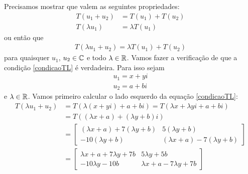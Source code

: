 \documentclass[12pt]{exam}
\begin{document}
    \solucao Precisamos mostrar que valem as seguintes propriedades:
    \begin{align}
        T(u_1 + u_2) &= T(u_1) + T(u_2)\\
        T(\lambda u_1) &= \lambda T(u_1)
    \end{align}
    ou então que
    \begin{align}\label{condicaoTL}
        T(\lambda u_1 + u_2) = \lambda T(u_1) + T(u_2)
    \end{align}
    para quaisquer $u_1$, $u_2 \in \mathbb{C}$ e todo $\lambda \in \mathbb{R}$.
    Vamos fazer a verificação de que a condição \eqref{condicaoTL} é verdadeira. Para isso sejam
    \begin{align*}
        u_1 = x + yi\\
        u_2 = a + bi
    \end{align*}
    e $\lambda \in \mathbb{R}$. Vamos primeiro calcular o lado esquerdo da equação \eqref{condicaoTL}:
    \begin{align}\label{parte1}
        T(\lambda u_1 + u_2) &= T(\lambda(x + yi) + a + bi) = T(\lambda x + \lambda yi + a + bi)\nonumber \\ &= T((\lambda x + a) + (\lambda y + b)i)\nonumber \\ &=
        \begin{bmatrix}
            (\lambda x + a) + 7(\lambda y + b) & 5(\lambda y + b)\\
            -10(\lambda y + b) & (\lambda x + a) - 7(\lambda y + b)
        \end{bmatrix}\nonumber\\
        &= \begin{bmatrix}
            \lambda x + a + 7\lambda y + 7b & 5\lambda y + 5b\\
            -10\lambda y - 10b & \lambda x + a - 7\lambda y + 7b
        \end{bmatrix}
    \end{align}
\end{document}
